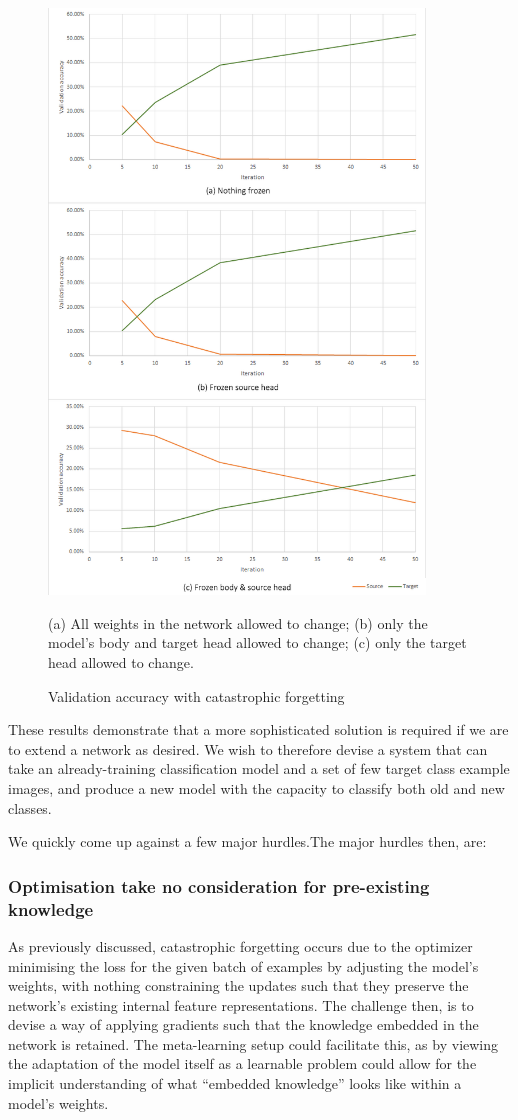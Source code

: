 \documentclass{report}
\begin{document}
\begin{figure}[!h]
 \centering
 \includegraphics[width=10cm]{dir-1}
 \caption{Validation accuracy with catastrophic forgetting}
 (a) All weights in the network allowed to change; (b) only the model's body and target head allowed to change; (c) only the target head allowed to change.
 \label{fig:dir:1}
\end{figure}
These results demonstrate that a more sophisticated solution is required if we are to extend a network as desired. We wish to therefore devise a system that can take an already-training classification model and a set of few target class example images, and produce a new model with the capacity to classify both old and new classes. \par
We quickly come up against a few major hurdles.The major hurdles then, are:
\subsubsection{Optimisation take no consideration for pre-existing knowledge}
As previously discussed, catastrophic forgetting occurs due to the optimizer minimising the loss for the given batch of examples by adjusting the model's weights, with nothing constraining the updates such that they preserve the network's existing internal feature representations. The challenge then, is to devise a way of applying gradients such that the knowledge embedded in the network is retained. The meta-learning setup could facilitate this, as by viewing the adaptation of the model itself as a learnable problem could allow for the implicit understanding of what ``embedded knowledge'' looks like within a model's weights.
\end{document}
